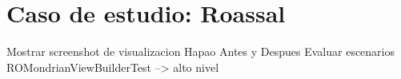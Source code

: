 \chapter{Caso de estudio: Roassal}

Mostrar screenshot de visualizacion Hapao Antes y Despues
Evaluar escenarios
ROMondrianViewBuilderTest --> alto nivel